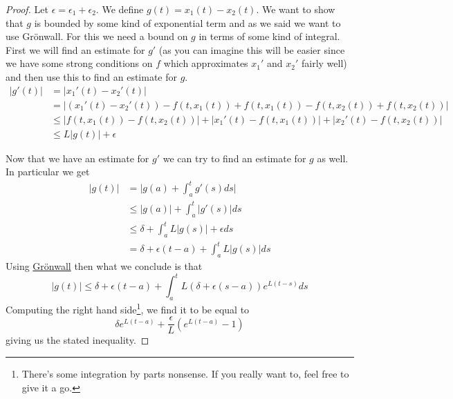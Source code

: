 \begin{proof}
    Let $\epsilon = \epsilon_1 + \epsilon_2$. We define $g(t) = x_1(t) - x_2(t)$. We want to show that $g$ is bounded by some kind of exponential term and as we said we want to use Grönwall. For this we need a bound on $g$ in terms of some kind of integral. First we will find an estimate for $g'$ (as you can imagine this will be easier since we have some strong conditions on $f$ which approximates $x_1'$ and $x_2'$ fairly well) and then use this to find an estimate for $g$.
    \begin{align*}
        |g'(t)| &= |x_1'(t) - x_2'(t)|\\
        &= | (x_1'(t) - x_2'(t)) - f(t, x_1(t)) + f(t, x_1(t)) - f(t, x_2(t)) + f(t, x_2(t)) |\\
        &\leq |f(t, x_1(t)) - f(t, x_2(t))| + | x_1'(t) - f(t, x_1(t)) | + |x_2'(t) - f(t, x_2(t))|\\
        &\leq L |g(t)| + \epsilon
    \end{align*}
    
    Now that we have an estimate for $g'$ we can try to find an estimate for $g$ as well. In particular we get
    \begin{align*}
        |g(t)| &= \bigg| g(a) + \int_a^t g'(s) ds \bigg|\\
        &\leq |g(a)| + \int_a^t|g'(s)| ds\\
        &\leq \delta + \int_a^t L |g(s)| + \epsilon ds\\
        &= \delta + \epsilon(t - a) + \int_a^t L |g(s)| ds
    \end{align*}
    Using \hyperref[thm:big-gronwall]{Grönwall} then what we conclude is that
    $$ |g(t)| \leq \delta + \epsilon(t - a) + \int_a^t L(\delta + \epsilon(s - a)) e^{L(t - s)} ds $$
    Computing the right hand side\footnote{There's some integration by parts nonsense. If you really want to, feel free to give it a go.}, we find it to be equal to
    $$ \delta e^{L(t - a)} + \frac{\epsilon}{L} (e^{L(t - a)} - 1) $$
    giving us the stated inequality.
\end{proof}

